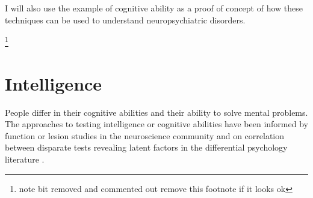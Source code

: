 I will also use the example of cognitive ability as a proof of concept of how these techniques can be used to understand neuropsychiatric disorders.


\footnote{note bit removed and commented out remove this footnote if it looks ok}






\section{Intelligence}
\label{sec:Introduction intelligence}

People differ in their cognitive abilities and their ability to solve mental problems. The approaches to testing intelligence or cognitive abilities have been informed by function or lesion studies in the neuroscience community and on correlation between disparate tests revealing latent factors in the differential psychology literature \cite{deary2014stability}. %
